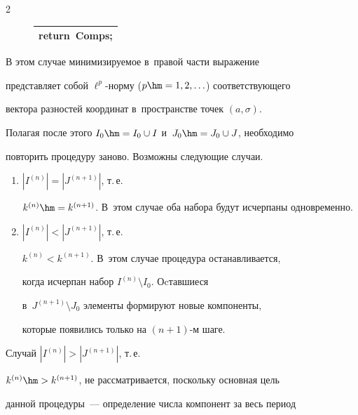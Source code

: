 \begin{multicols}{2}
\begin{figure}[b]
{\begin{center}
\begin{tabular}{l}
\\

\hspace*{8mm}\textbf{return}\ Comps;\\

\hline

\end{tabular}

\end{center}}

\vspace*{-6pt}

\end{figure}





В этом случае минимизируемое в~правой час\-ти выражение 

представляет собой $\ell^p$-нор\-му ($p\hm=1,2,\ldots$) соответствующего 

вектора разностей координат в~пространстве точек $(a,\sigma)$.



Полагая после этого $I_0\hm=I_0\cup I$ и~$J_0\hm=J_0\cup J$, необходимо 

повторить процедуру заново. Возможны следующие случаи.

\begin{enumerate}

\item $\left|I^{(n)}\right|=\left|J^{(n+1)}\right|$, т.\,е.\ 

$k^{(n)}\hm=k^{(n+1)}$. В~этом случае оба набора будут исчерпаны одновременно.

\item $\left|I^{(n)}\right|<\left|J^{(n+1)}\right|$, т.\,е.\

 $k^{(n)}<k^{(n+1)}$. В~этом случае процедура останавливается, 

 когда исчерпан набор $I^{(n)} \setminus I_0$. Оcтавшиеся 

 в~$J^{(n+1)}\setminus J_0$ элементы формируют новые компоненты, 

 которые появились только на $(n+1)$-м шаге.

\end{enumerate}



Случай $\left|I^{(n)}\right|>\left|J^{(n+1)}\right|$, т.\,е.\

 $k^{(n)}\hm>k^{(n+1)}$, не рассматривается, поскольку основная цель 

 данной процедуры~--- определение чис\-ла компонент за весь период 


\end{multicols}
